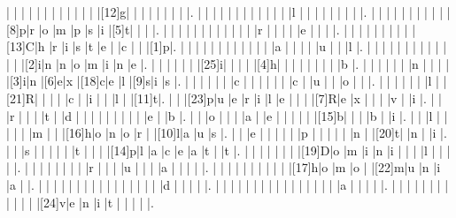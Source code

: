 \documentclass[12pt]{article}
\begin{document}
\begin{Puzzle}{22}{24}
  |{}  |{}  |{}  |{}  |{}  |{}  |{}  |{}  |{}  |{}  |{}  |{}  |[12]g|{}  |{}  |{}  |{}  |{}  |{}  |{}  |{}  |.
  |{}  |{}  |{}  |{}  |{}  |{}  |{}  |{}  |{}  |{}  |{}  |{}  |l   |{}  |{}  |{}  |{}  |{}  |{}  |{}  |{}  |.
  |{}  |{}  |{}  |{}  |{}  |{}  |{}  |{}  |{}  |{}  |[8]p|r   |o   |m   |p   |s   |i   |[5]t|{}  |{}  |{}  |.
  |{}  |{}  |{}  |{}  |{}  |{}  |{}  |{}  |{}  |{}  |{}  |{}  |r   |{}  |{}  |{}  |{}  |e   |{}  |{}  |{}  |.
  |{}  |{}  |{}  |{}  |{}  |{}  |{}  |{}  |{}  |[13]C|h   |r   |i   |s   |t   |e   |{}  |c   |{}  |{}  |[1]p|.
  |{}  |{}  |{}  |{}  |{}  |{}  |{}  |{}  |{}  |{}  |{}  |{}  |a   |{}  |{}  |{}  |{}  |u   |{}  |{}  |l   |.
  |{}  |{}  |{}  |{}  |{}  |{}  |{}  |{}  |{}  |{}  |{}  |{}  |{}  |[2]i|n   |n   |o   |m   |i   |n   |e   |.
  |{}  |{}  |{}  |{}  |{}  |{}  |[25]i|{}  |{}  |{}  |{}  |[4]h|{}  |{}  |{}  |{}  |{}  |{}  |{}  |{}  |b   |.
  |{}  |{}  |{}  |{}  |{}  |{}  |n   |{}  |{}  |{}  |{}  |[3]i|n   |[6]e|x   |[18]c|e   |l   |[9]s|i   |s   |.
  |{}  |{}  |{}  |{}  |{}  |{}  |c   |{}  |{}  |{}  |{}  |{}  |{}  |c   |{}  |u   |{}  |{}  |o   |{}  |{}  |.
  |{}  |{}  |{}  |{}  |{}  |{}  |l   |{}  |[21]R|{}  |{}  |{}  |{}  |c   |{}  |i   |{}  |{}  |l   |{}  |[11]t|.
  |{}  |{}  |[23]p|u   |e   |r   |i   |l   |e   |{}  |{}  |{}  |[7]R|e   |x   |{}  |{}  |{}  |v   |{}  |i   |.
  |{}  |{}  |r   |{}  |{}  |{}  |t   |{}  |d   |{}  |{}  |{}  |{}  |{}  |{}  |{}  |{}  |{}  |e   |{}  |b   |.
  |{}  |{}  |o   |{}  |{}  |{}  |a   |{}  |e   |{}  |{}  |{}  |{}  |{}  |[15]b|{}  |{}  |{}  |b   |{}  |i   |.
  |{}  |{}  |l   |{}  |{}  |{}  |{}  |{}  |m   |{}  |{}  |[16]h|o   |n   |o   |r   |{}  |[10]l|a   |u   |s   |.
  |{}  |{}  |e   |{}  |{}  |{}  |{}  |{}  |p   |{}  |{}  |{}  |{}  |{}  |n   |{}  |[20]t|{}  |n   |{}  |i   |.
  |{}  |{}  |s   |{}  |{}  |{}  |{}  |{}  |t   |{}  |{}  |{}  |[14]p|l   |a   |c   |e   |a   |t   |{}  |t   |.
  |{}  |{}  |{}  |{}  |{}  |{}  |{}  |[19]D|o   |m   |i   |n   |i   |{}  |{}  |{}  |l   |{}  |{}  |{}  |{}  |.
  |{}  |{}  |{}  |{}  |{}  |{}  |{}  |{}  |r   |{}  |{}  |{}  |u   |{}  |{}  |{}  |a   |{}  |{}  |{}  |{}  |.
  |{}  |{}  |{}  |{}  |{}  |{}  |{}  |{}  |{}  |{}  |[17]h|o   |m   |o   |{}  |[22]m|u   |n   |i   |a   |{}  |.
  |{}  |{}  |{}  |{}  |{}  |{}  |{}  |{}  |{}  |{}  |{}  |{}  |{}  |{}  |{}  |{}  |d   |{}  |{}  |{}  |{}  |.
  |{}  |{}  |{}  |{}  |{}  |{}  |{}  |{}  |{}  |{}  |{}  |{}  |{}  |{}  |{}  |{}  |a   |{}  |{}  |{}  |{}  |.
  |{}  |{}  |{}  |{}  |{}  |{}  |{}  |{}  |{}  |{}  |{}  |{}  |[24]v|e   |n   |i   |t   |{}  |{}  |{}  |{}  |.
\end{Puzzle}
\end{document}

